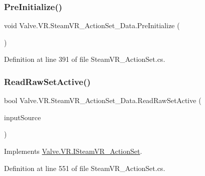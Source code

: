 \mbox{\label{class_valve_1_1_v_r_1_1_steam_v_r___action_set___data_aa8f10fb84c2bb84d8d397bca87a26448}} 
\subsubsection{\texorpdfstring{PreInitialize()}{PreInitialize()}}
{\footnotesize\ttfamily void Valve.\+V\+R.\+Steam\+V\+R\+\_\+\+Action\+Set\+\_\+\+Data.\+Pre\+Initialize (\begin{DoxyParamCaption}{ }\end{DoxyParamCaption})}



Definition at line 391 of file Steam\+V\+R\+\_\+\+Action\+Set.\+cs.

\mbox{\label{class_valve_1_1_v_r_1_1_steam_v_r___action_set___data_a24bdfaf2e0d0505b09055633ac7cfbc3}} 
\subsubsection{\texorpdfstring{ReadRawSetActive()}{ReadRawSetActive()}}
{\footnotesize\ttfamily bool Valve.\+V\+R.\+Steam\+V\+R\+\_\+\+Action\+Set\+\_\+\+Data.\+Read\+Raw\+Set\+Active (\begin{DoxyParamCaption}\item[{\mbox{\hyperlink{namespace_valve_1_1_v_r_a82e5bf501cc3aa155444ee3f0662853f}{Steam\+V\+R\+\_\+\+Input\+\_\+\+Sources}}}]{input\+Source }\end{DoxyParamCaption})}



Implements \mbox{\hyperlink{interface_valve_1_1_v_r_1_1_i_steam_v_r___action_set_a7db619853c00ffb7ac16ba370921ac4e}{Valve.\+V\+R.\+I\+Steam\+V\+R\+\_\+\+Action\+Set}}.



Definition at line 551 of file Steam\+V\+R\+\_\+\+Action\+Set.\+cs.

